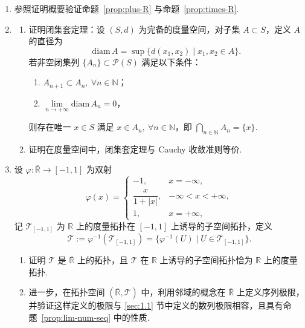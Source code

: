 \documentclass[../main.tex]{subfiles}
\begin{document}
\begin{enumerate}
    \item 参照证明概要验证命题~\ref{prop:plus-R} 与命题~\ref{prop:times-R}. 

    \item \begin{enumerate}
        \item 证明闭集套定理：设 $(S, d)$ 为完备的度量空间，对子集 $A \subset S$，定义 $A$ 的直径为 
        $$
        \mathrm{diam}\, A = \sup\{d(x_1, x_2) \mid x_1, x_2 \in A\}. 
        $$
        若非空闭集列 $\{A_n\} \subset \mathcal{P}(S)$ 满足以下条件：
        \begin{enumerate}[label = (\roman*)]
            \item $A_{n + 1} \subset A_n,\ \forall n \in \mathbb N$；
            \item $\lim\limits_{n \to +\infty} \mathrm{diam}\, A_n = 0$，
        \end{enumerate}
        则存在唯一 $x \in S$ 满足 $x \in A_n,\ \forall n \in \mathbb N$，即 $\bigcap\limits_{n \in \mathbb N} A_n = \{x\}$. 

        \item 证明在度量空间中，闭集套定理与 Cauchy 收敛准则等价. 
    \end{enumerate}

    \item 设 $\varphi:\overline{\mathbb R} \to [-1, 1]$ 为双射
    $$
    \varphi(x) = \begin{cases}
        -1, & x = -\infty,  \\
        \dfrac{x}{1 + |x|}, & -\infty < x < +\infty,  \\
        1, & x = +\infty, 
    \end{cases}
    $$
    记 $\mathcal{T}_{[-1, 1]}$ 为 $\mathbb R$ 上的度量拓扑在 $[-1, 1]$ 上诱导的子空间拓扑，定义 
    $$
    \mathcal{T} := \varphi^{-1}(\mathcal{T}_{[-1, 1]}) = \{\varphi^{-1}(U) \mid U \in \mathcal{T}_{[-1, 1]}\}. 
    $$ 
    \begin{enumerate}
        \item 证明 $\mathcal{T}$ 是 $\overline{\mathbb R}$ 上的拓扑，且 $\mathcal{T}$ 在 $\mathbb R$ 上诱导的子空间拓扑恰为 $\mathbb R$ 上的度量拓扑. 
        \item 进一步，在拓扑空间 $(\overline{\mathbb R}, \mathcal{T})$ 中，利用邻域的概念在 $\overline{\mathbb R}$ 上定义序列极限，并验证这样定义的极限与 \ref{sec:1.1} 节中定义的数列极限相容，且具有命题~\ref{prop:lim-num-seq} 中的性质. 
    \end{enumerate}


\end{enumerate}
\end{document}
